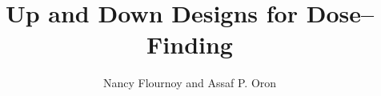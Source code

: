 \documentclass{book}
\begin{document}
\title{Up and Down Designs for Dose--Finding}
\author{Nancy Flournoy and Assaf P. Oron}

\begin{doublespace}
\maketitle
\frontmatter
\tableofcontents
\mainmatter
{}

\setcounter{chapter}{24}

\maketitle




\end{doublespace}

\begin{center}
%


\end{center}
\end{document}
